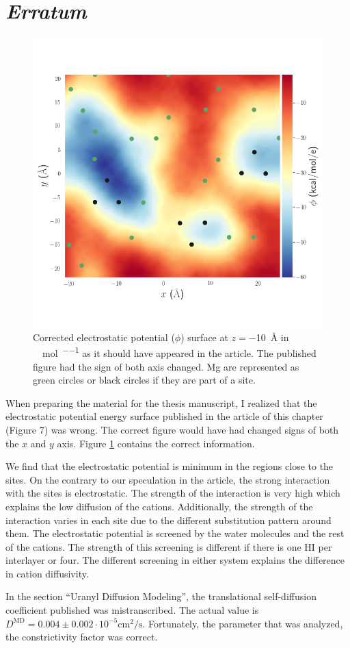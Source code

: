 \section[\textit{Erratum}]{\textit{Erratum}}
\begin{figure}
\centering 
\includegraphics[width=0.75\columnwidth]{./images/erratum_EPS.png}
\caption[Correction to Electrostatic Potential Surface]{Corrected electrostatic potential 
($\phi$) surface at $z=$\SI{-10}{\angstrom} in \si{\kilo\cal\per\mol\per\e} as it should have 
appeared in the article. The published figure had the sign of both axis changed. Mg are 
represented as green circles or black circles if they are part of a site.}
\label{erratum_EPS}
\end{figure}
When preparing the material for the thesis manuscript, I realized that the electrostatic 
potential energy surface published in the article 
of this chapter (Figure 7) was wrong. The correct figure would have had changed signs 
of both the $x$ and $y$ axis. Figure \ref{erratum_EPS} contains the correct information. 

We find that the electrostatic potential is minimum in the regions close to the sites. On the 
contrary to our speculation in the article, the strong interaction with the sites is 
electrostatic. The strength of the interaction is very high which explains the 
low diffusion of the cations. Additionally, the strength of the interaction varies in each 
site due to the different substitution pattern around them. The electrostatic 
potential is screened by the water molecules and the rest of the cations. The strength of this 
screening is different if there is one HI per interlayer or four. The different screening in 
either system explains the difference in cation diffusivity. 

In the section ``Uranyl Diffusion Modeling'', the translational self-diffusion coefficient 
published was mistranscribed. The 
actual value is $D^\text{MD}=0.004\pm0.002\cdot 10^{-5}\si{\centi\meter\squared\per\second}$. 
Fortunately, the parameter that was analyzed, the constrictivity factor was correct.